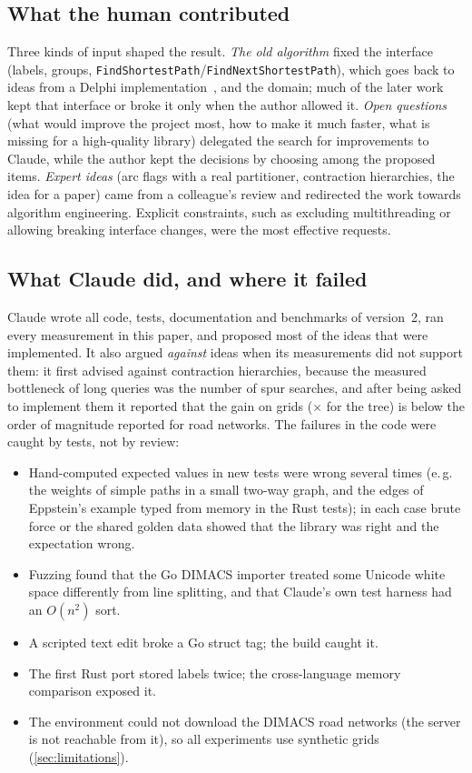 \documentclass[11pt,a4paper]{article}
\makeatletter
\newcommand{\eg}{e.\,g.\@\xspace}
\makeatother
\begin{document}
\subsection{What the human contributed}
Three kinds of input shaped the result. \emph{The old algorithm} fixed the interface (labels, groups,
\texttt{FindShortestPath}/\texttt{FindNextShortestPath}), which goes back to ideas from a Delphi
implementation~\cite{guentherodt}, and the domain; much of the later work kept that interface
or broke it only when the author allowed it. \emph{Open questions} (what would improve the project most, how to make
it much faster, what is missing for a high-quality library) delegated the search for improvements to Claude, while
the author kept the decisions by choosing among the proposed items. \emph{Expert ideas} (arc flags with a real
partitioner, contraction hierarchies, the idea for a paper) came from a colleague's review and redirected the work
towards algorithm engineering. Explicit constraints, such as excluding multithreading or allowing breaking interface
changes, were the most effective requests.

\subsection{What Claude did, and where it failed}
Claude wrote all code, tests, documentation and benchmarks of version~2, ran every measurement in this paper, and
proposed most of the ideas that were implemented. It also argued \emph{against} ideas when its measurements did not
support them: it first advised against contraction hierarchies, because the measured bottleneck of long queries was
the number of spur searches, and after being asked to implement them it reported that the gain on grids
(\NumPhastSpeedupBig$\times$ for the tree) is below the order of magnitude reported for road networks. The failures
in the code were caught by tests, not by review:
\begin{itemize}
  \item Hand-computed expected values in new tests were wrong several times (\eg{} the weights of simple paths in a
        small two-way graph, and the edges of Eppstein's example typed from memory in the Rust tests); in each case
        brute force or the shared golden data showed that the library was right and the expectation wrong.
  \item Fuzzing found that the Go DIMACS importer treated some Unicode white space differently from line splitting,
        and that Claude's own test harness had an $O(n^2)$ sort.
  \item A scripted text edit broke a Go struct tag; the build caught it.
  \item The first Rust port stored labels twice; the cross-language memory comparison exposed it.
  \item The environment could not download the DIMACS road networks (the server is not reachable from it),
        so all experiments use synthetic grids (\cref{sec:limitations}).
\end{itemize}
\end{document}
